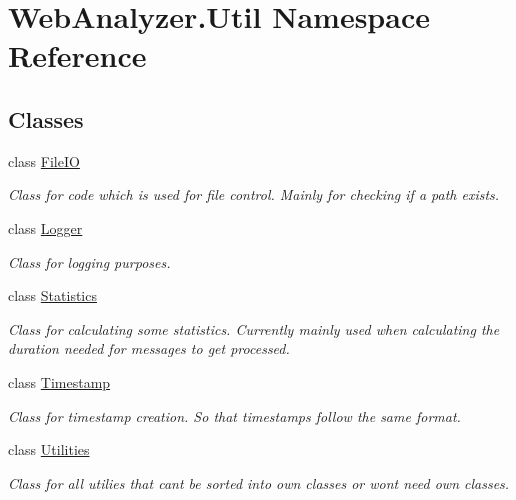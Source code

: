 \hypertarget{namespace_web_analyzer_1_1_util}{}\section{Web\+Analyzer.\+Util Namespace Reference}
\label{namespace_web_analyzer_1_1_util}
\subsection*{Classes}
\begin{DoxyCompactItemize}
\item 
class \hyperlink{class_web_analyzer_1_1_util_1_1_file_i_o}{File\+I\+O}
\begin{DoxyCompactList}\small\item\em Class for code which is used for file control. Mainly for checking if a path exists. \end{DoxyCompactList}\item 
class \hyperlink{class_web_analyzer_1_1_util_1_1_logger}{Logger}
\begin{DoxyCompactList}\small\item\em Class for logging purposes. \end{DoxyCompactList}\item 
class \hyperlink{class_web_analyzer_1_1_util_1_1_statistics}{Statistics}
\begin{DoxyCompactList}\small\item\em Class for calculating some statistics. Currently mainly used when calculating the duration needed for messages to get processed. \end{DoxyCompactList}\item 
class \hyperlink{class_web_analyzer_1_1_util_1_1_timestamp}{Timestamp}
\begin{DoxyCompactList}\small\item\em Class for timestamp creation. So that timestamps follow the same format. \end{DoxyCompactList}\item 
class \hyperlink{class_web_analyzer_1_1_util_1_1_utilities}{Utilities}
\begin{DoxyCompactList}\small\item\em Class for all utilies that can\textquotesingle{}t be sorted into own classes or won\textquotesingle{}t need own classes. \end{DoxyCompactList}\end{DoxyCompactItemize}
